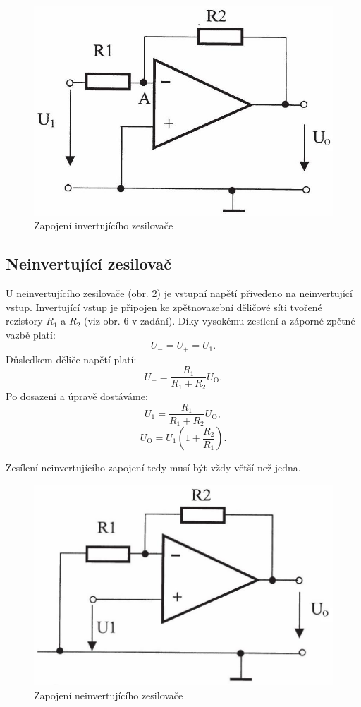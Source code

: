 \documentclass[czech,11pt,a4paper]{article}
\begin{document}
\begin{multicols}{2}
		
	\begin{figure}[H]
		\centering
		\includegraphics[width=0.8\linewidth]{inv}
		\caption{Zapojení invertujícího zesilovače}
		\label{fig: Zapojení invertujícího zesilovače}
	\end{figure}

		
		\subsection{Neinvertující zesilovač}
		
		U neinvertujícího zesilovače (obr. 2) je vstupní napětí přivedeno na neinvertující vstup. Invertující vstup je připojen ke zpětnovazební děličové síti tvořené rezistory $R_1$ a $R_2$ (viz obr. 6 v zadání). Díky vysokému zesílení a záporné zpětné vazbě platí:
		\begin{equation}
			U_- = U_+ = U_1.
		\end{equation}
		Důsledkem děliče napětí platí:
		\begin{equation}
			U_- = \frac{R_1}{R_1 + R_2} U_\mathrm{O}.
		\end{equation}
		Po dosazení a úpravě dostáváme:
		\begin{equation}
			U_1 = \frac{R_1}{R_1 + R_2} U_\mathrm{O},
		\end{equation}
		\begin{equation}
			U_\mathrm{O} = U_1 \left( 1 + \frac{R_2}{R_1} \right).
		\end{equation}
		
		Zesílení neinvertujícího zapojení tedy musí být vždy větší než jedna.
		\begin{figure}[H]
			\centering
			\includegraphics[width=0.8\linewidth]{noninv}
			\caption{Zapojení neinvertujícího zesilovače}
			\label{fig:noninv}
		\end{figure}

\end{multicols}
\end{document}

